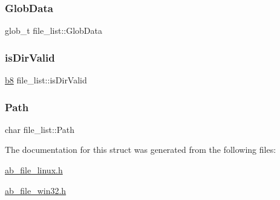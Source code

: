 \mbox{\label{structfile__list_a8b9c52b0dbeb615a3d2ec8c4e75fce49}} 
\subsubsection{\texorpdfstring{Glob\+Data}{GlobData}}
{\footnotesize\ttfamily glob\+\_\+t file\+\_\+list\+::\+Glob\+Data}

\mbox{\label{structfile__list_ab563e99003e66a0dbee5f5e4a4129b84}} 
\subsubsection{\texorpdfstring{is\+Dir\+Valid}{isDirValid}}
{\footnotesize\ttfamily \hyperlink{ab__common_8h_a70e369648385b50f2d0588e8e8745275}{b8} file\+\_\+list\+::is\+Dir\+Valid}

\mbox{\label{structfile__list_a50f2703df63faf3266542b422b417cd9}} 
\subsubsection{\texorpdfstring{Path}{Path}}
{\footnotesize\ttfamily char file\+\_\+list\+::\+Path}



The documentation for this struct was generated from the following files\+:\begin{DoxyCompactItemize}
\item 
\hyperlink{ab__file__linux_8h}{ab\+\_\+file\+\_\+linux.\+h}\item 
\hyperlink{ab__file__win32_8h}{ab\+\_\+file\+\_\+win32.\+h}\end{DoxyCompactItemize}
